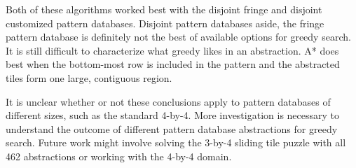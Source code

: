 \documentclass[letterpaper]{article}
\begin{document}
Both of these algorithms worked best with the disjoint fringe and disjoint customized pattern databases.  Disjoint pattern databases aside, the fringe pattern database is definitely not the best of available options for greedy search.  It is still difficult to characterize what greedy likes in an abstraction.  A* does best when the bottom-most row is included in the pattern and the abstracted tiles form one large, contiguous region.

It is unclear whether or not these conclusions apply to pattern databases of different sizes, such as the standard 4-by-4.  More investigation is necessary to understand the outcome of different pattern database abstractions for greedy search.  Future work might involve solving the 3-by-4 sliding tile puzzle with all 462 abstractions or working with the 4-by-4 domain.





\end{document}

